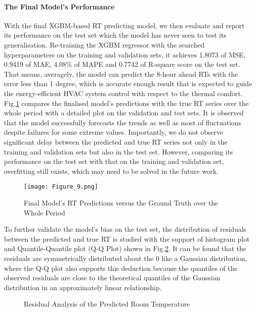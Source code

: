 \documentclass[11pt]{article}
\begin{document}
    \paragraph{The Final Model’s Performance}
    With the final XGBM-based RT predicting model, we then evaluate and report its performance on the test set which the model has never seen to test its generalisation. Re-training the XGBM regressor with the searched hyperparameters on the training and validation sets, it achieves 1.8073 of MSE, 0.9419 of MAE, 4.08\% of MAPE and 0.7742 of R-square score on the test set. That means, averagely, the model can predict the 8-hour ahead RTs with the error less than 1 degree, which is accurate enough result that is expected to guide the energy-efficient HVAC system control with respect to the thermal comfort. Fig.\ref{Final_Performance} compares the finalised model’s predictions with the true RT series over the whole period with a detailed plot on the validation and test sets. It is observed that the model successfully forecasts the trends as well as most of fluctuations despite failures for some extreme values. Importantly, we do not observe significant delay between the predicted and true RT series not only in the training and validation sets but also in the test set. However, comparing its performance on the test set with that on the training and validation set, overfitting still exists, which may need to be solved in the future work.
    
    \begin{figure}[htbp]
    	\centering
    	\texttt{[image: Figure\_9.png]}
    	\caption{Final Model’s RT Predictions versus the Ground Truth over the Whole Period}
    	\label{Final_Performance}
    \end{figure}   
    
    To further validate the model’s bias on the test set, the distribution of residuals between the predicted and true RT is studied with the support of histogram plot and Quantile-Quantile plot (Q-Q Plot) shown in Fig.\ref{Residuals}. It can be found that the residuals are symmetrically distributed about the 0 like a Gaussian distribution, where the Q-Q plot also supports this deduction because the quantiles of the observed residuals are close to the theoretical quantiles of the Gaussian distribution in an approximately linear relationship.
    
    \begin{figure}[htbp]
        \centering
        \caption{Residual Analysis of the Predicted Room Temperature}
        \label{Residuals}
    \end{figure}
    
\end{document}
